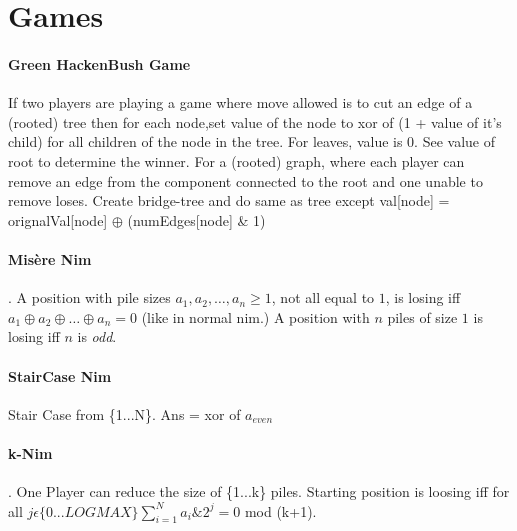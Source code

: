 \let\le=\leqslant
\let\ge=\geqslant
 
\setlength{\parindent}{0pt}
\setlength{\parskip}{-5mm}
\newcommand{\Topic}{\paragraph}
 
\newcommand{\Section}[1]{
 \section*{#1}
 \addcontentsline{toc}{subsection}{#1}
 \vspace{2mm}
}
 
 

\Section{Games}
\Topic{Green HackenBush Game} If two players are playing a game where move allowed is to cut an edge of a (rooted) tree then for each node,set value of the node to xor of (1 + value of it's child) for all children of the node in the tree. For leaves, value is 0. See value of root to determine the winner. For a (rooted) graph, where each player can remove an edge from the component connected to the root and one unable to remove loses. Create bridge-tree and do same as tree except val[node] = orignalVal[node] $\oplus$ (numEdges[node] \& 1) \\
\Topic{Mis\`{e}re Nim}.
A position with pile sizes $a_1, a_2, \dots, a_n \ge 1$,
not all equal to $1$, is losing iff $a_1 \oplus a_2 \oplus \dots \oplus a_n = 0$
(like in normal nim.)
A position with $n$ piles of size $1$ is losing iff $n$ is \emph{odd}.\newline
\Topic{StairCase Nim} Stair Case from \{1...N\}. Ans = xor of $a_{even}$ \\
\Topic{k-Nim}. One Player can reduce the size of \{1...k\} piles. Starting position is loosing iff for all $j \epsilon \{0...LOGMAX\} \sum_{i=1}^{N} a_{i}\&2^{j} = 0$ mod (k+1).
\\

